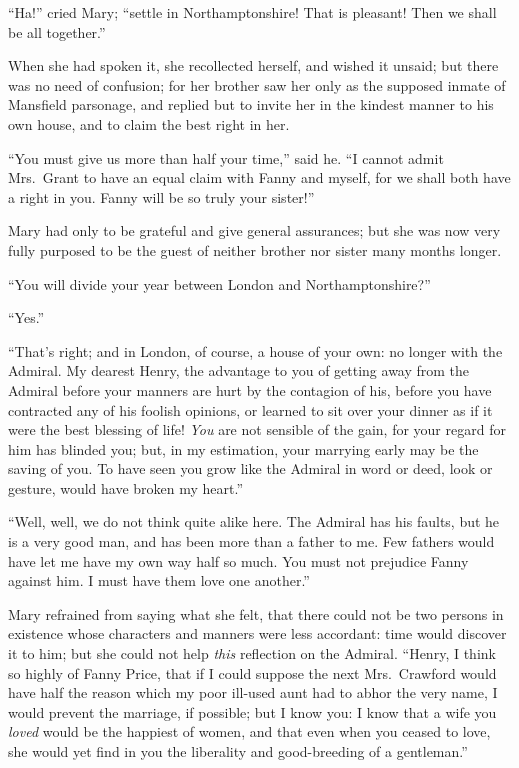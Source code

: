 ``Ha!'' cried Mary; ``settle in Northamptonshire!
That is pleasant!  Then we shall be all together.''

When she had spoken it, she recollected herself,
and wished it unsaid; but there was no need of confusion;
for her brother saw her only as the supposed inmate
of Mansfield parsonage, and replied but to invite her
in the kindest manner to his own house, and to claim
the best right in her.

``You must give us more than half your time,'' said he.
``I cannot admit Mrs.\ Grant to have an equal claim with
Fanny and myself, for we shall both have a right in you.
Fanny will be so truly your sister!''

Mary had only to be grateful and give general assurances;
but she was now very fully purposed to be the guest of
neither brother nor sister many months longer.

``You will divide your year between London and Northamptonshire?''

``Yes.''

``That's right; and in London, of course, a house of
your own:  no longer with the Admiral.  My dearest Henry,
the advantage to you of getting away from the Admiral
before your manners are hurt by the contagion of his,
before you have contracted any of his foolish opinions,
or learned to sit over your dinner as if it were the best
blessing of life!  \emph{You} are not sensible of the gain,
for your regard for him has blinded you; but, in my estimation,
your marrying early may be the saving of you.  To have seen
you grow like the Admiral in word or deed, look or gesture,
would have broken my heart.''

``Well, well, we do not think quite alike here.
The Admiral has his faults, but he is a very good man,
and has been more than a father to me.  Few fathers would
have let me have my own way half so much.  You must
not prejudice Fanny against him.  I must have them love
one another.''

Mary refrained from saying what she felt, that there could
not be two persons in existence whose characters and manners
were less accordant:  time would discover it to him;
but she could not help \emph{this} reflection on the Admiral.
``Henry, I think so highly of Fanny Price, that if I could
suppose the next Mrs.\ Crawford would have half the reason
which my poor ill-used aunt had to abhor the very name,
I would prevent the marriage, if possible; but I know you:
I know that a wife you \emph{loved} would be the happiest
of women, and that even when you ceased to love, she would
yet find in you the liberality and good-breeding of
a gentleman.''

